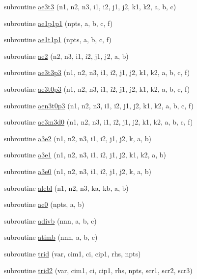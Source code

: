 \begin{DoxyCompactItemize}
subroutine \hyperlink{numutils_8f90_ac2e1c1c248ff911dd1173c4b56503be2}{ae3t3} (n1, n2, n3, i1, i2, j1, j2, k1, k2, a, b, c)
\item 
subroutine \hyperlink{numutils_8f90_a99fba5362eaeb7897b1a0eace10c91de}{ae1p1p1} (npts, a, b, c, f)
\item 
subroutine \hyperlink{numutils_8f90_a3721ba4c899c4302586533c163ae7285}{ae1t1p1} (npts, a, b, c, f)
\item 
subroutine \hyperlink{numutils_8f90_a14d380679699217b1b38dda0c099c8f0}{ae2} (n2, n3, i1, i2, j1, j2, a, b)
\item 
subroutine \hyperlink{numutils_8f90_a3f7cc03c1d50032864b5af257887c59b}{ae3t3p3} (n1, n2, n3, i1, i2, j1, j2, k1, k2, a, b, c, f)
\item 
subroutine \hyperlink{numutils_8f90_ad321eda089dbda0472503a96519c2aac}{ae3t0p3} (n1, n2, n3, i1, i2, j1, j2, k1, k2, a, b, c, f)
\item 
subroutine \hyperlink{numutils_8f90_a02df9d2ed929d4252f902451e16914ff}{aen3t0p3} (n1, n2, n3, i1, i2, j1, j2, k1, k2, a, b, c, f)
\item 
subroutine \hyperlink{numutils_8f90_aa2d8a897ccb4869d53ce5dccb343f2a7}{ae3m3d0} (n1, n2, n3, i1, i2, j1, j2, k1, k2, a, b, c, f)
\item 
subroutine \hyperlink{numutils_8f90_ab7fad0f450a8de5b0a356c1c6fc0a4ed}{a3e2} (n1, n2, n3, i1, i2, j1, j2, k, a, b)
\item 
subroutine \hyperlink{numutils_8f90_acbb5833d968925b51ee47f4ec007cea5}{a3e1} (n1, n2, n3, i1, i2, j1, j2, k1, k2, a, b)
\item 
subroutine \hyperlink{numutils_8f90_abf96507f2f57d7059bb52112f82ccd02}{a3e0} (n1, n2, n3, i1, i2, j1, j2, k, a, b)
\item 
subroutine \hyperlink{numutils_8f90_a587fe398735f109f384b371392c4eab3}{alebl} (n1, n2, n3, ka, kb, a, b)
\item 
subroutine \hyperlink{numutils_8f90_abdd083f40194de286a301d8bcab9cf94}{ae0} (npts, a, b)
\item 
subroutine \hyperlink{numutils_8f90_a61fd91bee4603eaab6649bdee9293361}{adivb} (nnn, a, b, c)
\item 
subroutine \hyperlink{numutils_8f90_a0d0fad164662105925b7a53f3c65187f}{atimb} (nnn, a, b, c)
\item 
subroutine \hyperlink{numutils_8f90_a3e598010f4726433e0b3a67c98fa9051}{trid} (var, cim1, ci, cip1, rhs, npts)
\item 
subroutine \hyperlink{numutils_8f90_ad685e0bac592f5d213ace92d8e1df8b3}{trid2} (var, cim1, ci, cip1, rhs, npts, scr1, scr2, scr3)

\end{DoxyCompactItemize}
